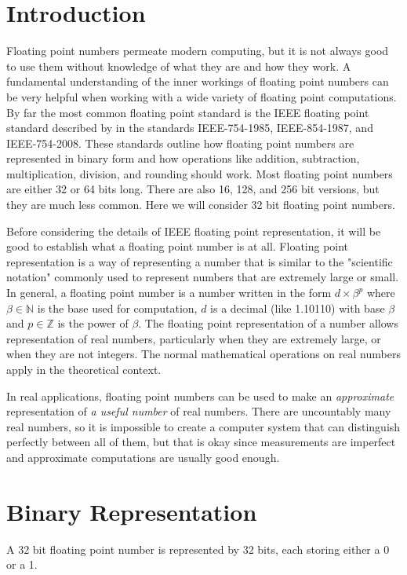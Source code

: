 \label{lab:IEEE}

\section*{Introduction}

Floating point numbers permeate modern computing, but it is not always good to use them without knowledge of what they are and how they work.
A fundamental understanding of the inner workings of floating point numbers can be very helpful when working with a wide variety of floating point computations.
By far the most common floating point standard is the IEEE floating point standard described by in the standards IEEE-754-1985, IEEE-854-1987, and IEEE-754-2008.
These standards outline how floating point numbers are represented in binary form and how operations like addition, subtraction, multiplication, division, and rounding should work.
Most floating point numbers are either 32 or 64 bits long.
There are also 16, 128, and 256 bit versions, but they are much less common.
Here we will consider 32 bit floating point numbers.

Before considering the details of IEEE floating point representation, it will be good to establish what a floating point number is at all.
Floating point representation is a way of representing a number that is similar to the "scientific notation" commonly used to represent numbers that are extremely large or small.
In general, a floating point number is a number written in the form $d \times \beta^p$ where $\beta \in \mathbb{N}$ is the base used for computation, $d$ is a decimal (like 1.10110) with base $\beta$ and $p\in \mathbb{Z}$ is the power of $\beta$.
The floating point representation of a number allows representation of real numbers, particularly when they are extremely large, or when they are not integers.
The normal mathematical operations on real numbers apply in the theoretical context.

In real applications, floating point numbers can be used to make an \textit{approximate} representation of \textit{a useful number} of real numbers.
There are uncountably many real numbers, so it is impossible to create a computer system that can distinguish perfectly between all of them, but that is okay since measurements are imperfect and approximate computations are usually good enough.

\section*{Binary Representation}

A 32 bit floating point number is represented by 32 bits, each storing either a 0 or a 1.
